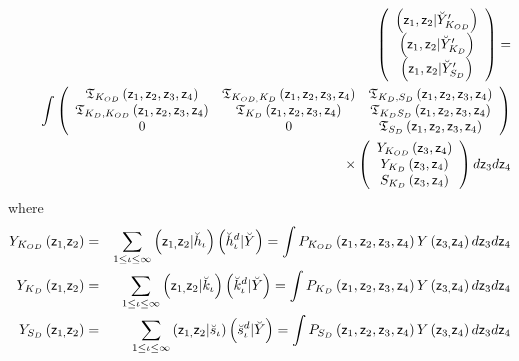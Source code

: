 \begin{eqnarray}
&&\left( 
\begin{array}{c}
\left( {\sf z}_{1},{\sf z}_{2}|\breve{Y}_{K_{OD}}^{\prime }\right) \\ 
\left( {\sf z}_{1},{\sf z}_{2}|\breve{Y}_{K_{D}}^{\prime }\right) \\ 
\left( {\sf z}_{1},{\sf z}_{2}|\breve{Y}_{S_{D}}^{\prime }\right)%
\end{array}%
\right) =  \nonumber \\
&&\int \left( 
\begin{array}{ccc}
{\frak T}_{K_{OD}}\left( {\sf z}_{1},{\sf z}_{2},{\sf z}_{3},{\sf z}%
_{4}\right) & {\frak T}_{K_{OD,}K_{D}}\left( {\sf z}_{1},{\sf z}_{2},{\sf z}%
_{3},{\sf z}_{4}\right) & {\frak T}_{K_{D},S_{D}}\left( {\sf z}_{1},{\sf z}%
_{2},{\sf z}_{3},{\sf z}_{4}\right) \\ 
{\frak T}_{K_{D},K_{OD}}\left( {\sf z}_{1},{\sf z}_{2},{\sf z}_{3},{\sf z}%
_{4}\right) & {\frak T}_{K_{D}}\left( {\sf z}_{1},{\sf z}_{2},{\sf z}_{3},%
{\sf z}_{4}\right) & {\frak T}_{K_{D}S_{D}}\left( {\sf z}_{1},{\sf z}_{2},%
{\sf z}_{3},{\sf z}_{4}\right) \\ 
0 & 0 & {\frak T}_{S_{D}}\left( {\sf z}_{1},{\sf z}_{2},{\sf z}_{3},{\sf z}%
_{4}\right)%
\end{array}%
\right)  \nonumber \\
&&\qquad \qquad \qquad \qquad \qquad \qquad \qquad \qquad \qquad \qquad
\qquad \qquad \times \left( 
\begin{array}{c}
Y_{K_{OD}}\left( {\sf z}_{3},{\sf z}_{4}\right) \\ 
Y_{K_{D}}\left( {\sf z}_{3},{\sf z}_{4}\right) \\ 
S_{K_{D}}\left( {\sf z}_{3},{\sf z}_{4}\right)%
\end{array}%
\right) d{\sf z}_{3}d{\sf z}_{4}  \label{kerneq}
\end{eqnarray}%
where 
\begin{eqnarray}
Y_{K_{OD}}\left( {\sf z}_{1,}{\sf z}_{2}\right) &=&\sum_{1\leq \iota \leq
\infty }\left( {\sf z}_{1,}{\sf z}_{2}|\breve{h}_{\iota }\right) \left( 
\breve{h}_{\iota }^{d}|\breve{Y}\right) =\int P_{K_{OD}}\left( {\sf z}_{1},%
{\sf z}_{2},{\sf z}_{3},{\sf z}_{4}\right) Y\left( {\sf z}_{3,}{\sf z}%
_{4}\right) d{\sf z}_{3}d{\sf z}_{4}  \nonumber \\
Y_{K_{D}}\left( {\sf z}_{1,}{\sf z}_{2}\right) &=&\sum_{1\leq \iota \leq
\infty }\left( {\sf z}_{1,}{\sf z}_{2}|\breve{k}_{\iota }\right) \left( 
\breve{k}_{\iota }^{d}|\breve{Y}\right) =\int P_{K_{D}}\left( {\sf z}_{1},%
{\sf z}_{2},{\sf z}_{3},{\sf z}_{4}\right) Y\left( {\sf z}_{3,}{\sf z}%
_{4}\right) d{\sf z}_{3}d{\sf z}_{4}  \nonumber \\
Y_{S_{D}}\left( {\sf z}_{1,}{\sf z}_{2}\right) &=&\sum_{1\leq \iota \leq
\infty }\left( {\sf z}_{1,}{\sf z}_{2}|\breve{s}_{\iota }\right) \left( 
\breve{s}_{\iota }^{d}|\breve{Y}\right) =\int P_{S_{D}}\left( {\sf z}_{1},%
{\sf z}_{2},{\sf z}_{3},{\sf z}_{4}\right) Y\left( {\sf z}_{3,}{\sf z}%
_{4}\right) d{\sf z}_{3}d{\sf z}_{4}
\end{eqnarray}

